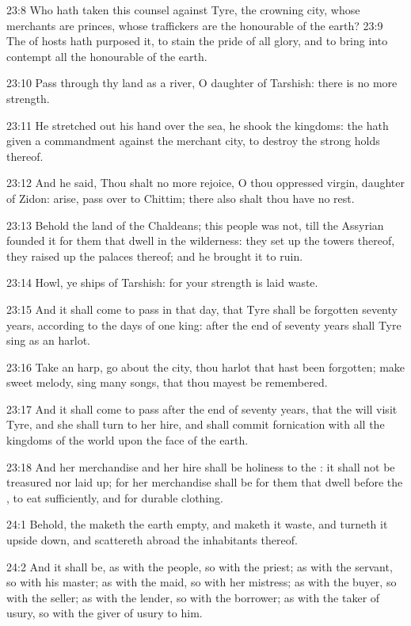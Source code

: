 23:8 Who hath taken this counsel against Tyre, the crowning city, whose merchants are princes, whose traffickers are the honourable of the earth?  23:9 The \LORD of hosts hath purposed it, to stain the pride of all glory, and to bring into contempt all the honourable of the earth.

23:10 Pass through thy land as a river, O daughter of Tarshish: there is no more strength.

23:11 He stretched out his hand over the sea, he shook the kingdoms: the \LORD hath given a commandment against the merchant city, to destroy the strong holds thereof.

23:12 And he said, Thou shalt no more rejoice, O thou oppressed virgin, daughter of Zidon: arise, pass over to Chittim; there also shalt thou have no rest.

23:13 Behold the land of the Chaldeans; this people was not, till the Assyrian founded it for them that dwell in the wilderness: they set up the towers thereof, they raised up the palaces thereof; and he brought it to ruin.

23:14 Howl, ye ships of Tarshish: for your strength is laid waste.

23:15 And it shall come to pass in that day, that Tyre shall be forgotten seventy years, according to the days of one king: after the end of seventy years shall Tyre sing as an harlot.

23:16 Take an harp, go about the city, thou harlot that hast been forgotten; make sweet melody, sing many songs, that thou mayest be remembered.

23:17 And it shall come to pass after the end of seventy years, that the \LORD will visit Tyre, and she shall turn to her hire, and shall commit fornication with all the kingdoms of the world upon the face of the earth.

23:18 And her merchandise and her hire shall be holiness to the \LORD: it shall not be treasured nor laid up; for her merchandise shall be for them that dwell before the \LORD, to eat sufficiently, and for durable clothing.

24:1 Behold, the \LORD maketh the earth empty, and maketh it waste, and turneth it upside down, and scattereth abroad the inhabitants thereof.

24:2 And it shall be, as with the people, so with the priest; as with the servant, so with his master; as with the maid, so with her mistress; as with the buyer, so with the seller; as with the lender, so with the borrower; as with the taker of usury, so with the giver of usury to him.

